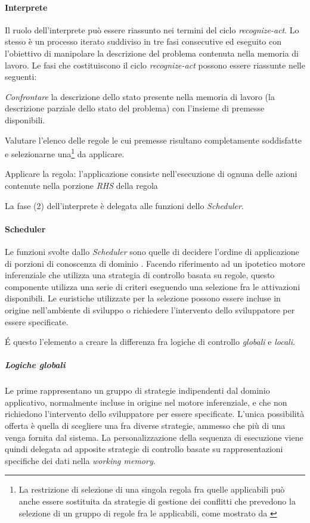 \paragraph{Interprete} Il ruolo dell'interprete può essere riassunto nei termini del ciclo \emph{recognize-act}. Lo stesso è un processo iterato suddiviso in tre fasi consecutive ed eseguito con l'obiettivo di manipolare la descrizione del problema contenuta nella memoria di lavoro. Le fasi che costituiscono il ciclo \emph{recognize-act} possono essere riassunte nelle seguenti:
\begin{list}{}{}
	\item[(1)] \emph{Confrontare} la descrizione dello stato presente nella memoria di lavoro (la descrizione parziale dello stato del problema) con l'insieme di premesse disponibili.
	\item[(2)] Valutare l'elenco delle regole le cui premesse risultano completamente soddisfatte e selezionarne una\footnote{La restrizione di selezione di una singola regola fra quelle applicabili può anche essere sostituita da strategie di gestione dei conflitti che prevedono la selezione di un gruppo di regole fra le applicabili, come mostrato da \cite{Doorenbos95productionmatching}} da applicare.
	\item[(3)] Applicare la regola: l'applicazione consiste nell'esecuzione di ognuna delle azioni contenute nella porzione \emph{RHS} della regola
\end{list}

La fase (2) dell'interprete è delegata alle funzioni dello \emph{Scheduler}. 

\paragraph{Scheduler} Le funzioni svolte dallo \emph{Scheduler} sono quelle di decidere l'ordine di applicazione di porzioni di conoscenza di dominio \cite{development1993}. Facendo riferimento ad un ipotetico motore inferenziale che utilizza una strategia di controllo basata su regole, questo componente utilizza una serie di criteri eseguendo una selezione fra le attivazioni disponibili. Le euristiche utilizzate per la selezione possono essere incluse in origine nell'ambiente di sviluppo o richiedere l'intervento dello sviluppatore per essere specificate.

\'E questo l'elemento a creare la differenza fra logiche di controllo \emph{globali} e \emph{locali}. 

\subparagraph{Logiche globali} Le prime rappresentano un gruppo di strategie indipendenti dal dominio applicativo, normalmente incluse in origine nel motore inferenziale, e che non richiedono l'intervento dello sviluppatore per essere specificate. L'unica possibilità offerta è quella di scegliere una fra diverse strategie, ammesso che più di una venga fornita dal sistema. La personalizzazione della sequenza di esecuzione viene quindi delegata ad apposite strategie di controllo basate su rappresentazioni specifiche dei dati nella \emph{working memory}.

